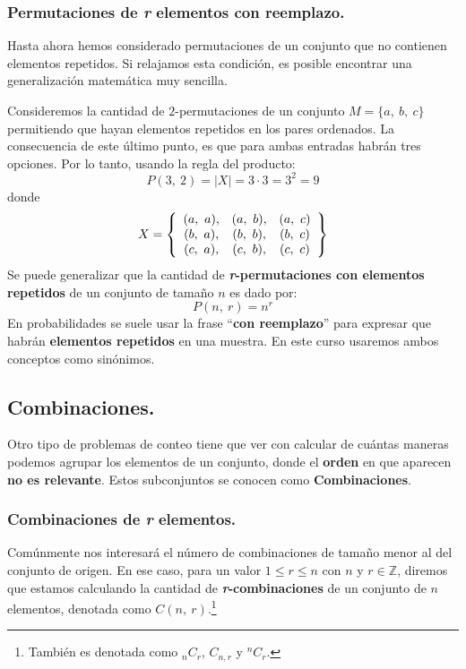 \documentclass[12pt]{article}
\begin{document}
\subsubsection{Permutaciones de \textit{r} elementos con reemplazo.}

Hasta ahora hemos considerado permutaciones de un conjunto que no contienen elementos repetidos. Si relajamos esta condición, es posible encontrar una generalización matemática muy sencilla.

Consideremos la cantidad de $2$-permutaciones de un conjunto $M = \{a, \ b, \ c\}$ permitiendo que hayan elementos repetidos en los pares ordenados. La consecuencia de este último punto, es que para ambas entradas habrán tres opciones. Por lo tanto, usando la regla del producto:
\[
  P(3, \ 2) = |X| = 3 \cdot 3 = 3^{2} = 9
\]
donde
\[
X = \left\{
\begin{array}{c c c}
(a, \ a), & (a, \ b), & (a, \ c) \\
(b, \ a), & (b, \ b), & (b, \ c) \\
(c, \ a), & (c, \ b), & (c, \ c) \\
\end{array}
\right\}
\]
Se puede generalizar que la cantidad de \textbf{\textit{r}-permutaciones con elementos repetidos} de un conjunto de tamaño $n$ es dado por:
\[
  P(n, \ r) = n^{r}
\]
En probabilidades se suele usar la frase ``\textbf{con reemplazo}'' para expresar que habrán \textbf{elementos repetidos} en una muestra. En este curso usaremos ambos conceptos como sinónimos.

\subsection{Combinaciones.}

Otro tipo de problemas de conteo tiene que ver con calcular de cuántas maneras podemos agrupar los elementos de un conjunto, donde el \textbf{orden} en que aparecen \textbf{no es relevante}. Estos subconjuntos se conocen como \textbf{Combinaciones}.

\subsubsection{Combinaciones de \textit{r} elementos.}

Comúnmente nos interesará el número de combinaciones de tamaño menor al del conjunto de origen. En ese caso, para un valor $1 \leq r \leq n$ con $n$ y $r \in \mathbb{Z}$, diremos que estamos calculando la cantidad de \textbf{\textit{r}-combinaciones} de un conjunto de $n$ elementos, denotada como $C(n, \ r)$.\footnote{También es denotada como ${}_{n}C_{r}$, $C_{n,r}$ y ${}^{n}C_{r}$.}
\end{document}
